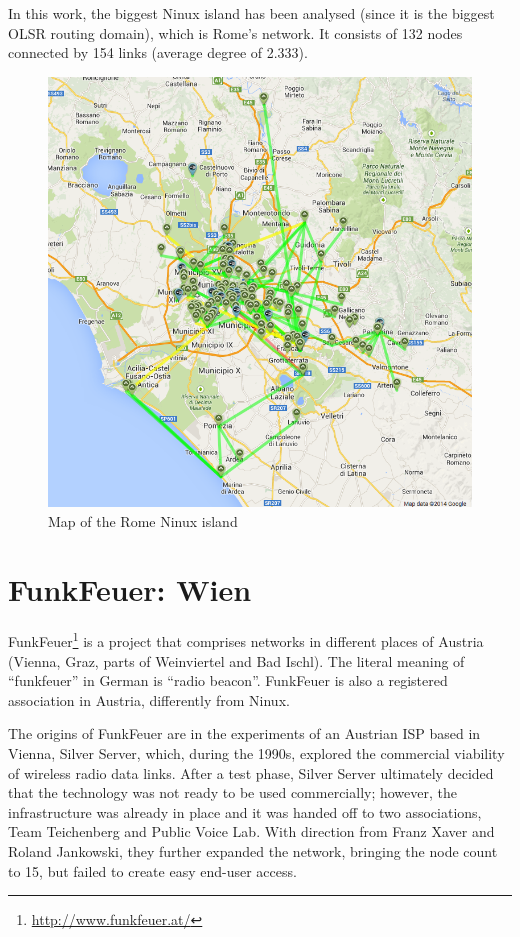 \documentclass[a4paper,11pt,twoside,openleft]{memoir}
\begin{document}
In this work, the biggest Ninux island has been analysed (since it is
the biggest OLSR routing domain), which is Rome's network. It consists
of 132 nodes connected by 154 links (average degree of 2.333).

\begin{figure}[htbp]
\centering
\includegraphics{images/ninux_map.png}
\caption{Map of the Rome Ninux island}
\end{figure}

\section{FunkFeuer: Wien}\label{funkfeuer-wien}

FunkFeuer\footnote{\url{http://www.funkfeuer.at/}} is a project that
comprises networks in different places of Austria (Vienna, Graz, parts of
Weinviertel and Bad Ischl). The literal meaning of ``funkfeuer'' in
German is ``radio beacon''. FunkFeuer is also a registered association
in Austria, differently from Ninux.

The origins of FunkFeuer are in the experiments of an Austrian ISP based
in Vienna, Silver Server, which, during the 1990s, explored the
commercial viability of wireless radio data links. After a test phase,
Silver Server ultimately decided that the technology was not ready to be
used commercially; however, the infrastructure was already in place and
it was handed off to two associations, Team Teichenberg and Public Voice
Lab. With direction from Franz Xaver and Roland Jankowski, they further
expanded the network, bringing the node count to 15, but failed to
create easy end-user access.
\end{document}
